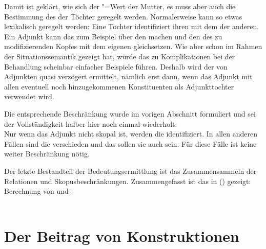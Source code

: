 Damit ist geklärt, wie sich der \ltop"=Wert der Mutter, es muss aber auch die Bestimmung des
\ltopwes der Töchter geregelt werden. Normalerweise kann so etwas lexikalisch geregelt werden: Eine
Tochter identifiziert ihren \ltopw mit dem der anderen. Ein Adjunkt kann das zum Beispiel über
den \modw machen und den \ltopw des zu modifizierenden Kopfes mit dem eigenen gleichsetzen. Wie
\citet{Kasper97a} aber schon im Rahmen der Situationssemantik gezeigt hat, würde das zu
Komplikationen bei der Behandlung scheinbar einfacher Beispiele führen. Deshalb wird der \ltopw von
Adjunkten quasi verzögert ermittelt, nämlich erst dann, wenn das Adjunkt mit allen eventuell noch
hinzugekommenen Konstituenten als Adjunkttochter verwendet wird.

Die entsprechende Beschränkung wurde im vorigen Abschnitt formuliert und sei der Vollständigkeit
halber hier noch einmal wiederholt:
\ea
\label{ex-scopal-ltop2}\label{Semantikprinzip-nicht-skopaleTochter-LTOP}
 \impl\\
\hfill 
{}
\z
Nur wenn das Adjunkt nicht skopal ist, werden die \ltopwe identifiziert. In allen anderen Fällen
sind die \ltopwe verschieden und das sollen sie auch sein. Für diese Fälle ist keine weiter
Beschränkung nötig.

Der letzte Bestandteil der Bedeutungsermittlung ist das Zusammensammeln der Relationen und
Skopusbeschränkungen. Zusammengefasst ist das in () gezeigt:
\ea
Berechnung von \rels und \hcons:\\
 \impl\\
\z




%


\section{Der Beitrag von Konstruktionen}

